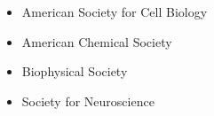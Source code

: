 \begin{itemize}
\item American Society for Cell Biology
\item American Chemical Society
\item Biophysical Society
\item Society for Neuroscience
\end{itemize}
